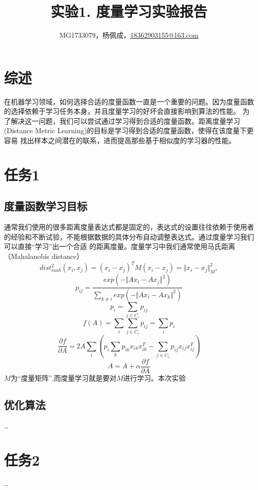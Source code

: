 \documentclass[a4paper,UTF8]{article}
\theoremstyle{definition}
\begin{document}
\title{实验1. 度量学习实验报告}
\author{MG1733079，杨佩成，\url{18362903155@163.com}}
\maketitle

\section*{综述}
	在机器学习领域，如何选择合适的度量函数一直是一个重要的问题。因为度量函数的选择依赖于学习任务本身，并且度量学习的好坏会直接影响到算法的性能。
为了解决这一问题，我们可以尝试通过学习得到合适的度量函数。距离度量学习(Distance Metric Learning)的目标是学习得到合适的度量函数，使得在该度量下更容易
找出样本之间潜在的联系，进而提高那些基于相似度的学习器的性能。

\section*{任务1}
	\subsection*{度量函数学习目标}
    通常我们使用的很多距离度量表达式都是固定的，表达式的设置往往依赖于使用者的经验和不断试验，不能根据数据的具体分布自动调整表达式。通过度量学习我们可以直接“学习”出一个合适
的距离度量。度量学习中我们通常使用马氏距离（Mahalanobis distance）
\begin{equation}
    dist^2_{mah}(x_i,x_j)=(x_i-x_j)^TM(x_i-x_j)=\Vert{x_i-x_j}\Vert^2_M ,
\end{equation}
\begin{equation}
    p_{ij}=\frac{exp{(-\Vert{Ax_i-Ax_j}\Vert^2)}}{\sum_{k\not=i}exp{(-\Vert{Ax_i-Ax_k}\Vert^2)}}
\end{equation}
\begin{equation}
    p_i=\sum_{j\in C_i}p_{ij}
\end{equation}
\begin{equation}
    f(A)=\sum_i \sum_{j\in C_i}p_{ij}=\sum_i p_i
\end{equation}
\begin{equation}
    \frac{\partial f}{\partial A}=2A\sum_i(p_i \sum_k p_{ik} x_{ik} x^T_{ik}-\sum_{j \in C_i}p_{ij}x_{ij}x^T_{ij})
\end{equation}
\begin{equation}
    A=A+\alpha \frac{\partial f}{\partial A}
\end{equation}
$M$为“度量矩阵”,而度量学习就是要对$M$进行学习。本次实验
	\subsection*{优化算法}
		\dots	
	
\section*{任务2}
	\dots
\end{document}
